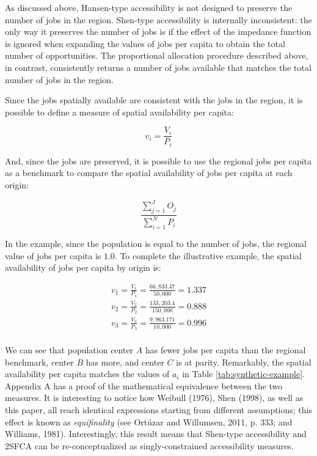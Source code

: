 \documentclass[]{elsarticle} %
\begin{document}
As discussed above, Hansen-type accessibility is not designed to
preserve the number of jobs in the region. Shen-type accessibility is
internally inconsistent: the only way it preserves the number of jobs is
if the effect of the impedance function is ignored when expanding the
values of jobs per capita to obtain the total number of opportunities.
The proportional allocation procedure described above, in contrast,
consistently returns a number of jobs available that matches the total
number of jobs in the region.

Since the jobs spatially available are consistent with the jobs in the
region, it is possible to define a measure of spatial availability per
capita:

\begin{equation}
\label{eq:SA-per-capita}
v_i = \frac{V_i}{P_i}
\end{equation}

And, since the jobs are preserved, it is possible to use the regional
jobs per capita as a benchmark to compare the spatial availability of
jobs per capita at each origin:

\begin{equation}
\label{eq:Regional-jobs-per-capita}
\frac{\sum_{j=1}^J O_j}{\sum_{i=1}^N P_i}
\end{equation}

In the example, since the population is equal to the number of jobs, the
regional value of jobs per capita is \(1.0\). To complete the
illustrative example, the spatial availability of jobs per capita by
origin is:

\begin{equation}
\label{eq:SA-per-capita-2populations}
\begin{array}{l}
v_{1} = \frac{V_1}{P_1} =  \frac{66,833.47}{50,000} = 1.337\\
v_{2} =  \frac{V_{2}}{P_2} =  \frac{133,203.4}{150,000} = 0.888\\
v_{3} =  \frac{V_{3}}{P_3} =  \frac{9,963.171}{10,000} = 0.996\\
\end{array}
\end{equation}

We can see that population center \(A\) has fewer jobs per capita than
the regional benchmark, center \(B\) has more, and center \(C\) is at
parity. Remarkably, the spatial availability per capita matches the
values of \(a_i\) in Table \ref{tab:synthetic-example}. Appendix A has a
proof of the mathematical equivalence between the two measures. It is
interesting to notice how Weibull (1976), Shen (1998), as well as this
paper, all reach identical expressions starting from different
assumptions; this effect is known as \emph{equifinality} (see Ortúzar
and Willumsen, 2011, p. 333; and Williams, 1981). Interestingly, this
result means that Shen-type accessibility and 2SFCA can be
re-conceptualized as singly-constrained accessibility measures.
\end{document}
